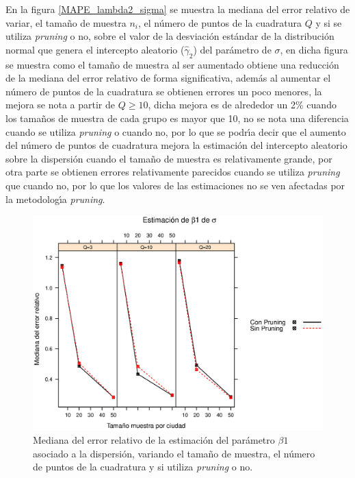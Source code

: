 En la figura \ref{MAPE_lambda2_sigma} se muestra la mediana del error relativo de variar, el tama\~{n}o de muestra $n_i$, el n\'{u}mero de puntos de la cuadratura $Q$ y si se utiliza \textit{pruning} o no, sobre el valor de la desviaci\'{o}n est\'{a}ndar de la distribuci\'{o}n normal que genera el intercepto aleatorio ($\hat{\gamma}_2$) del par\'{a}metro de $\sigma$, en dicha figura se muestra como el tama\~{n}o de muestra al ser aumentado obtiene una reducci\'{o}n de la mediana del error relativo de forma significativa, adem\'{a}s al aumentar el n\'{u}mero de puntos de la cuadratura se obtienen errores un poco menores, la mejora se nota a partir de $Q\geq10$, dicha mejora es de alrededor un 2\% cuando los tama\~{n}os de muestra de cada grupo es mayor que 10, no se nota una diferencia cuando se utiliza \textit{pruning} o cuando no, por lo que se podr\'{\i}a decir que el aumento del n\'{u}mero de puntos de cuadratura mejora la estimaci\'{o}n del intercepto aleatorio sobre la dispersi\'{o}n cuando el tama\~{n}o de muestra es relativamente grande, por otra parte se obtienen errores relativamente parecidos cuando se utiliza \textit{pruning} que cuando no, por lo que los valores de las estimaciones no se ven afectadas por la metodolog\'{\i}a \textit{pruning}.\\

\begin{figure}
	\begin{center}
		\includegraphics[scale=0.6]{MAPE_beta1_sigma.eps}	
		\caption{Mediana del error relativo de la estimaci\'{o}n del par\'{a}metro $\beta1$ asociado a la dispersi\'{o}n, variando el tama\~{n}o de muestra, el n\'{u}mero de puntos de la cuadratura y si utiliza \textit{pruning} o no.}
		\label{MAPE_beta1_sigma}
	\end{center}
\end{figure}

